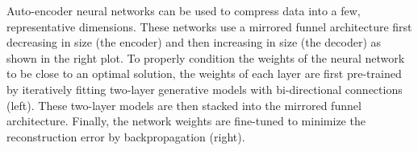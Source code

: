 Auto-encoder neural networks can be used to compress data into a few, representative dimensions. These networks use a mirrored funnel architecture first decreasing in size (the encoder) and then increasing in size (the decoder) as shown in the right plot. To properly condition the weights of the neural network to be close to an optimal solution, the weights of each layer are first pre-trained by iteratively fitting two-layer generative models with bi-directional connections (left). These two-layer models are then stacked into the mirrored funnel architecture. Finally, the network weights are fine-tuned to minimize the reconstruction error by backpropagation (right). \label{fig:stacked_rbms}

